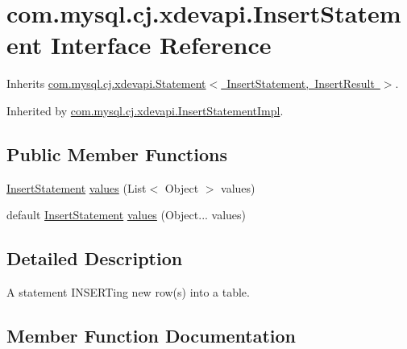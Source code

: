 \hypertarget{interfacecom_1_1mysql_1_1cj_1_1xdevapi_1_1_insert_statement}{}\section{com.\+mysql.\+cj.\+xdevapi.\+Insert\+Statement Interface Reference}
\label{interfacecom_1_1mysql_1_1cj_1_1xdevapi_1_1_insert_statement}


Inherits \mbox{\hyperlink{interfacecom_1_1mysql_1_1cj_1_1xdevapi_1_1_statement}{com.\+mysql.\+cj.\+xdevapi.\+Statement$<$ Insert\+Statement, Insert\+Result $>$}}.



Inherited by \mbox{\hyperlink{classcom_1_1mysql_1_1cj_1_1xdevapi_1_1_insert_statement_impl}{com.\+mysql.\+cj.\+xdevapi.\+Insert\+Statement\+Impl}}.

\subsection*{Public Member Functions}
\begin{DoxyCompactItemize}
\item 
\mbox{\hyperlink{interfacecom_1_1mysql_1_1cj_1_1xdevapi_1_1_insert_statement}{Insert\+Statement}} \mbox{\hyperlink{interfacecom_1_1mysql_1_1cj_1_1xdevapi_1_1_insert_statement_a9e215690da535d030277c17766cdbfbe}{values}} (List$<$ Object $>$ values)
\item 
default \mbox{\hyperlink{interfacecom_1_1mysql_1_1cj_1_1xdevapi_1_1_insert_statement}{Insert\+Statement}} \mbox{\hyperlink{interfacecom_1_1mysql_1_1cj_1_1xdevapi_1_1_insert_statement_a278914c27d67c2a8a5d71043eaeaae40}{values}} (Object... values)
\end{DoxyCompactItemize}


\subsection{Detailed Description}
A statement I\+N\+S\+E\+R\+Ting new row(s) into a table. 

\subsection{Member Function Documentation}
\mbox{\label{interfacecom_1_1mysql_1_1cj_1_1xdevapi_1_1_insert_statement_a9e215690da535d030277c17766cdbfbe}} 
